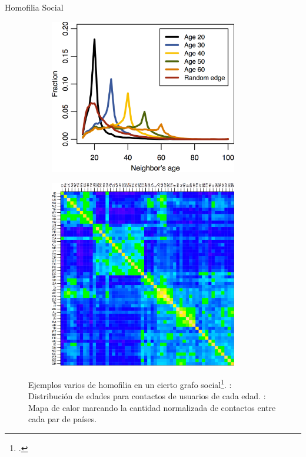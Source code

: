 \documentclass[usenames,dvipsnames,table]{beamer}
\begin{document}
\begin{frame}{Homofilia Social}
	\begin{figure}
		\begin{subfigure}[b]{0.48\framewidth}
			\includegraphics[width=0.9\textwidth]{age_homophily.png}
			\caption{}%
			\label{fig:age_homophily}
		\end{subfigure}
		\begin{subfigure}[b]{0.48\framewidth}
			\hfill{}
			\includegraphics[width=0.9\textwidth]{country_homophily.png}
			\caption{}%
			\label{fig:country_homophily}
		\end{subfigure}
		\caption{Ejemplos varios de homofilia en un cierto grafo social\footcite{ugander2011anatomy}. : Distribución de edades para contactos de usuarios de cada edad. : Mapa de calor marcando la cantidad normalizada de contactos entre cada par de países.}
	\end{figure}


\end{frame}
\end{document}
